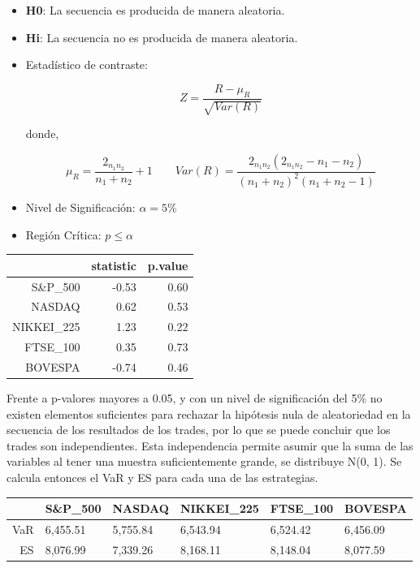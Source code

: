 \documentclass[a4paper,12pt]{Latex/Classes/PhDthesisPSnPDF}
\begin{document}
\begin{itemize}
\item \textbf{H0}: La secuencia es producida de manera aleatoria.
\item \textbf{Hi}: La secuencia no es producida de manera aleatoria.
\item Estadístico de contraste: 

$$Z = \frac{R - \mu_{R}}{\sqrt{Var(R)}}$$

donde,

$$\mu_{R} = \frac{2_{n_{1}n_{2}}}{n_{1}+n_{2}}+1  \qquad  Var(R) = \frac{2_{n_{1}n_{2}}(2_{n_{1}n_{2}}-n_{1}-n_{2})}{(n_{1}+n_{2})^{2}(n_{1}+n_{2}-1)}$$

\item Nivel de Significación: $\alpha = 5\%$
\item Región Crítica: $p \leq \alpha$
\end{itemize}

 
\begin{center}
\begin{table}[ht]
\centering
\begin{tabular}{rrr}
  \hline
 & statistic & p.value \\ 
  \hline
S\&P\_500 & -0.53 & 0.60 \\ 
  NASDAQ & 0.62 & 0.53 \\ 
  NIKKEI\_225 & 1.23 & 0.22 \\ 
  FTSE\_100 & 0.35 & 0.73 \\ 
  BOVESPA & -0.74 & 0.46 \\ 
   \hline
\end{tabular}
\end{table}\end{center}

Frente a p-valores mayores a 0.05, y con un nivel de significación del 5\% no existen elementos suficientes para rechazar la hipótesis nula de aleatoriedad en la secuencia de los resultados de los trades, por lo que se puede concluir que los trades son independientes. Esta independencia permite asumir que la suma de las variables al tener una muestra suficientemente grande, se distribuye N(0, 1). Se calcula entonces el VaR y ES para cada una de las estrategias.


\newpage
\begin{center}
\begin{table}[ht]
\centering
\begin{tabular}{rlllll}
  \hline
 & S\&P\_500 & NASDAQ & NIKKEI\_225 & FTSE\_100 & BOVESPA \\ 
  \hline
VaR & 6,455.51 & 5,755.84 & 6,543.94 & 6,524.42 & 6,456.09 \\ 
  ES & 8,076.99 & 7,339.26 & 8,168.11 & 8,148.04 & 8,077.59 \\ 
   \hline
\end{tabular}
\end{table}\end{center}
  
\end{document}
